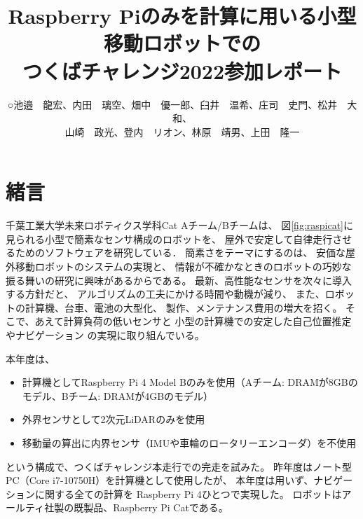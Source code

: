 \documentclass[twocolumn,9pt]{jsproceedings}
\title{Raspberry Piのみを計算に用いる小型移動ロボットでの\\つくばチャレンジ2022参加レポート}
\author{○池邉　龍宏\authorrefmark{1}、内田　璃空\authorrefmark{1}、畑中　優一郎\authorrefmark{1}、臼井　温希\authorrefmark{1}、庄司　史門\authorrefmark{1}、松井　大和\authorrefmark{1}、\\
山崎　政光\authorrefmark{1}、登内　リオン\authorrefmark{1}、林原　靖男\authorrefmark{1}、上田　隆一\authorrefmark{1}}
\affiliation{千葉工業大学 未来ロボティクス学科 Cat Aチーム/Bチーム}
\begin{document}
\maketitle



\section{緒言}

千葉工業大学未来ロボティクス学科Cat Aチーム/Bチームは、
図\ref{fig:raspicat}に見られる小型で簡素なセンサ構成のロボットを、
屋外で安定して自律走行させるためのソフトウェアを研究している．
簡素さをテーマにするのは、
安価な屋外移動ロボットのシステムの実現と、
情報が不確かなときのロボットの巧妙な振る舞いの研究に興味があるからである。
最新、高性能なセンサを次々に導入する方針だと、
アルゴリズムの工夫にかける時間や動機が減り、
また、ロボットの計算機、台車、電池の大型化、
製作、メンテナンス費用の増大を招く。
そこで、あえて計算負荷の低いセンサと
小型の計算機での安定した自己位置推定やナビゲーション
の実現に取り組んでいる。


本年度は、
\begin{itemize}
\item 計算機としてRaspberry Pi 4 Model Bのみを使用（Aチーム: DRAMが8GBのモデル、Bチーム: DRAMが4GBのモデル）
\item 外界センサとして2次元LiDARのみを使用
\item 移動量の算出に内界センサ（IMUや車輪のロータリーエンコーダ）を不使用
\end{itemize}
という構成で、つくばチャレンジ本走行での完走を試みた。
昨年度はノート型PC（Core i7-10750H）を計算機として使用したが、
本年度は用いず、ナビゲーションに関する全ての計算を
Raspberry Pi 4ひとつで実現した。
ロボットはアールティ社製の既製品、Raspberry Pi Catである。
\end{document}
